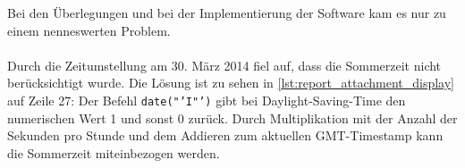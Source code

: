 Bei den Überlegungen und bei der Implementierung der Software kam es nur zu einem nenneswerten Problem.\\
\\
Durch die Zeitumstellung am 30. März 2014 fiel auf, dass die Sommerzeit nicht berücksichtigt wurde. Die Lösung ist zu sehen in \autoref{lst:report_attachment_display} auf Zeile 27: Der Befehl \texttt{date("'I"')} gibt bei Daylight-Saving-Time den numerischen Wert 1 und sonst 0 zurück. Durch Multiplikation mit der Anzahl der Sekunden pro Stunde und dem Addieren zum aktuellen GMT-Timestamp kann die Sommerzeit miteinbezogen werden.